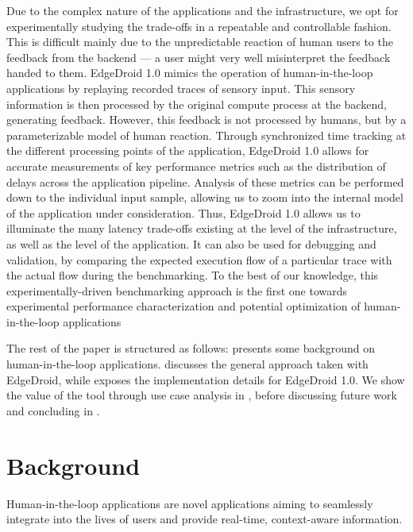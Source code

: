 Due to the complex nature of the applications and the infrastructure, we opt for experimentally studying the trade-offs in a repeatable and controllable fashion.
This is difficult mainly due to the unpredictable reaction of human users to the feedback from the backend --- a user might very well misinterpret the feedback handed to them.
EdgeDroid 1.0 mimics the operation of human-in-the-loop applications by replaying recorded traces of sensory input.
This sensory information is then processed by the original compute process at the backend, generating feedback.
However, this feedback is not processed by humans, but by a parameterizable model of human reaction.
Through synchronized time tracking at the different processing points of the application, EdgeDroid 1.0 allows for accurate measurements of key performance metrics such as the distribution of delays across the application pipeline.
Analysis of these metrics can be performed down to the individual input sample, allowing us to zoom into the internal model of the application under consideration.
Thus, EdgeDroid 1.0 allows us to illuminate the many latency trade-offs existing at the level of the infrastructure, as well as the level of the application.
It can also be used for debugging and validation, by comparing the expected execution flow of a particular trace with the actual flow during the benchmarking.
To the best of our knowledge, this experimentally-driven benchmarking approach is the first one towards experimental performance characterization and potential optimization of human-in-the-loop applications

The rest of the paper is structured as follows:
 presents some background on human-in-the-loop applications.
 discusses the general approach taken with EdgeDroid, while  exposes the implementation details for EdgeDroid 1.0.
We show the value of the tool through use case analysis in , before discussing future work and concluding in .


\section{Background}\label{sec:background}

Human-in-the-loop applications are novel applications aiming to seamlessly integrate into the lives of users and provide real-time, context-aware information.

